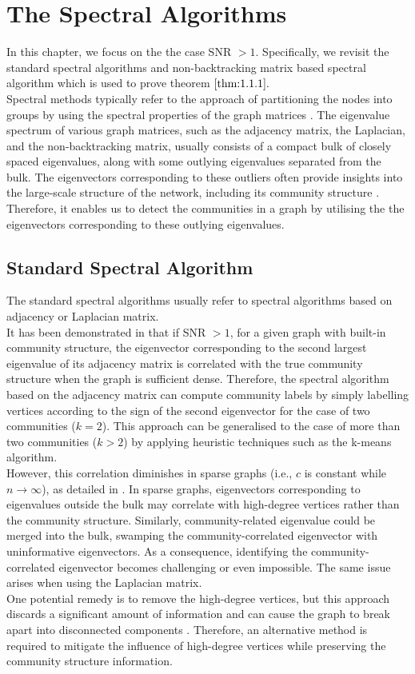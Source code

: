 \chapter{The Spectral Algorithms}\label{chapter:2}
In this chapter, we focus on the the case SNR $>1.$ Specifically, we revisit the standard spectral algorithms and non-backtracking matrix based spectral algorithm which is used to prove theorem $\ref{thm:1.1.1}.$\\
Spectral methods typically refer to the approach of partitioning the nodes into groups by using the  spectral properties of the graph matrices \cite{dallamico:tel-03454227}. The eigenvalue spectrum of various graph matrices, such as the adjacency matrix, the Laplacian, and the non-backtracking matrix, usually consists of a compact bulk of closely spaced eigenvalues, along with some outlying eigenvalues separated from the bulk. The eigenvectors corresponding to these outliers often  provide insights into the large-scale structure of the network, including its community structure \cite{userguide}. Therefore, it enables us to detect the communities in  a graph by utilising the the eigenvectors corresponding to these outlying eigenvalues.
\section{Standard Spectral Algorithm}
The standard spectral algorithms usually refer to spectral algorithms based on adjacency or Laplacian matrix. \\
It has been demonstrated in \cite{standard_spec_in_dense} that if SNR $>1$, for a given graph with built-in community structure, the eigenvector corresponding to the second largest eigenvalue of its adjacency matrix is correlated with the true community structure when the graph is sufficient dense. Therefore, the spectral algorithm based on the adjacency matrix can compute community labels by simply labelling vertices according to the sign of the second eigenvector for the case of two communities ($k=2$). This approach can be generalised to the case of more than two communities ($k>2$) by applying heuristic techniques such as the k-means algorithm.\\
However, this correlation diminishes in sparse graphs (i.e., $c$ is constant while $n\to\infty$), as detailed in \cite{the_non-backtracking}. In sparse graphs, eigenvectors corresponding to eigenvalues outside the bulk may correlate with high-degree vertices rather than the community structure. Similarly, community-related eigenvalue could be merged into the bulk, swamping the community-correlated eigenvector with uninformative eigenvectors. As a consequence, identifying the community-correlated eigenvector becomes challenging or even impossible. The same issue arises when using the Laplacian matrix.\\
One potential remedy is to remove the high-degree vertices, but this approach discards a significant amount of information and can cause the graph to break apart into disconnected components \cite{TheConjecture}. Therefore, an alternative method is required to mitigate the influence of high-degree vertices while preserving the community structure information.

